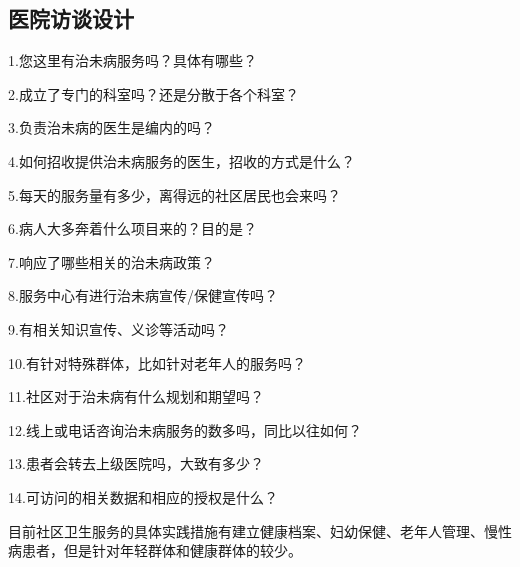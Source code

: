 \subsection{医院访谈设计}
1.您这里有治未病服务吗？具体有哪些？

2.成立了专门的科室吗？还是分散于各个科室？

3.负责治未病的医生是编内的吗？

4.如何招收提供治未病服务的医生，招收的方式是什么？

5.每天的服务量有多少，离得远的社区居民也会来吗？

6.病人大多奔着什么项目来的？目的是？

7.响应了哪些相关的治未病政策？

8.服务中心有进行治未病宣传/保健宣传吗？

9.有相关知识宣传、义诊等活动吗？

10.有针对特殊群体，比如针对老年人的服务吗？

11.社区对于治未病有什么规划和期望吗？

12.线上或电话咨询治未病服务的数多吗，同比以往如何？

13.患者会转去上级医院吗，大致有多少？

14.可访问的相关数据和相应的授权是什么？

目前社区卫生服务的具体实践措施有建立健康档案、妇幼保健、老年人管理、慢性病患者，但是针对年轻群体和健康群体的较少。

